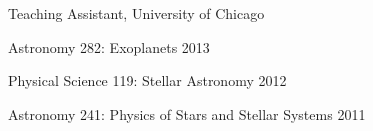 \documentclass[12pt,letterpaper]{article}
\renewenvironment{itemize}{
	\begin{list}{}{
	\setlength{\leftmargin}{1mm}%
	\setlength{\itemsep}{0pt}%
	\setlength{\parskip}{0pt}
	}
}{
	\end{list}
}
\begin{document}
\begin{compactitem}[]
\item Teaching Assistant, University of Chicago
	\begin{compactitem}
	\item Astronomy 282:  Exoplanets \hfill 2013
	\item Physical Science 119:  Stellar Astronomy	\hfill 2012
	\item Astronomy 241:  Physics of Stars and Stellar Systems \hfill	2011 
	\end{compactitem}
\end{compactitem}







\vspace{7mm}
\end{document}
